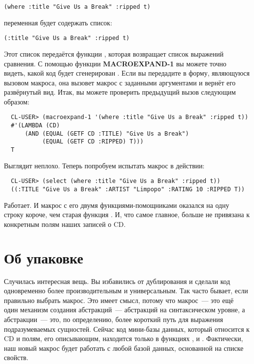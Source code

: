 \begin{lstlisting}
(where :title "Give Us a Break" :ripped t)
\end{lstlisting}

переменная  будет содержать список:

\begin{lstlisting}
(:title "Give Us a Break" :ripped t)
\end{lstlisting}

Этот список передаётся функции , которая возвращает список
выражений сравнения. С помощью функции \textbf{MACROEXPAND-1} вы можете точно видеть,
какой код будет сгенерирован . Если вы передадите в 
форму, являющуюся вызовом макроса, она вызовет макрос с заданными аргументами и вернёт его
развёрнутый вид. Итак, вы можете проверить предыдущий вызов  следующим
образом:

\begin{verbatim}
  CL-USER> (macroexpand-1 '(where :title "Give Us a Break" :ripped t))
  #'(LAMBDA (CD)
      (AND (EQUAL (GETF CD :TITLE) "Give Us a Break")
           (EQUAL (GETF CD :RIPPED) T)))
  T
\end{verbatim}

Выглядит неплохо. Теперь попробуем испытать макрос в действии:

\begin{verbatim}
  CL-USER> (select (where :title "Give Us a Break" :ripped t))
  ((:TITLE "Give Us a Break" :ARTIST "Limpopo" :RATING 10 :RIPPED T))
\end{verbatim}

Работает. И макрос  с его двумя функциями-помощниками оказался на одну строку
короче, чем старая функция . И, что самое главное,  больше не
привязана к конкретным полям наших записей о CD.

\section{Об упаковке}

Случилась интересная вещь. Вы избавились от дублирования и сделали код одновременно более
производительным и универсальным. Так часто бывает, если правильно выбрать макрос. Это
имеет смысл, потому что макрос~--- это ещё один механизм создания абстракций~---
абстракций на синтаксическом уровне, а абстракции~--- это, по определению, более короткий
путь для выражения подразумеваемых сущностей. Сейчас код мини-базы данных, который
относится к CD и полям, его описывающим, находится только в функциях ,
 и . Фактически, наш новый макрос будет работать с любой
базой данных, основанной на списке свойств.


